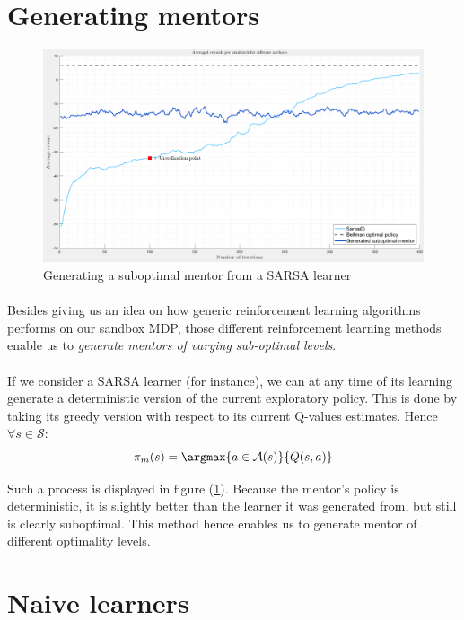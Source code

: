 \documentclass[a4paper]{report}
\begin{document}
{	\section{Generating mentors}
	{
	
		\begin{figure}[h!]
			\begin{center}
				\includegraphics[width=0.7\linewidth]{mentor_gen}
				\caption{Generating a suboptimal mentor from a SARSA learner}
				\label{fig::mentor_gen}
			\end{center}
		\end{figure}
		
		\paragraph{} Besides giving us an idea on how generic reinforcement learning algorithms performs on our sandbox MDP, those different reinforcement learning methods enable us to \emph{generate mentors of varying sub-optimal levels}. 
		
		\paragraph{} If we consider a SARSA learner (for instance), we can at any time of its learning generate a deterministic version of the current exploratory policy. This is done by taking its greedy version with respect to its current Q-values estimates. Hence $\forall s\in\mathcal{S}$: 
		\begin{equation}
			\pi_m(s) = \argmax{a\in\mathcal{A}(s)}{Q(s,a)}
		\end{equation}
		
		Such a process is displayed in figure (\ref{fig::mentor_gen}). Because the mentor's policy is deterministic, it is slightly better than the learner it was generated from, but still is clearly suboptimal. This method hence enables us to generate mentor of different optimality levels. 
	}
	\section{Naive learners}
	{
		\label{section::naive_learners}
}}
\end{document}

